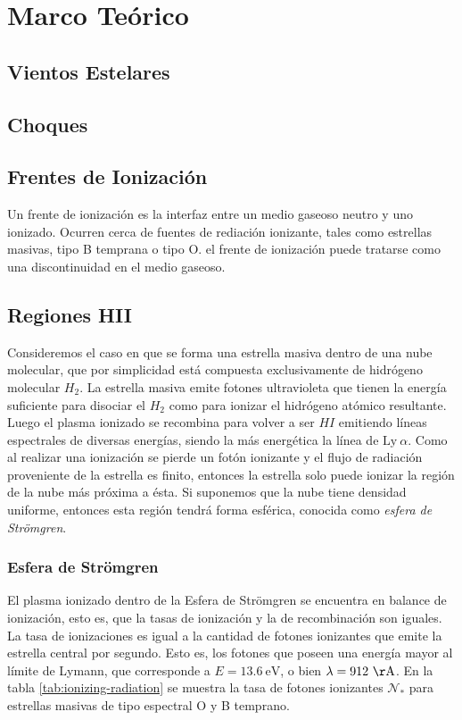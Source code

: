 \chapter{Marco Teórico}
\section{Vientos Estelares}
\section{Choques}
\section{Frentes de Ionización}
Un frente de ionización es la interfaz entre un medio gaseoso neutro y uno
ionizado. Ocurren cerca de fuentes de rediación ionizante, tales como
estrellas masivas, tipo B temprana o tipo O. el frente de ionización puede
tratarse como una discontinuidad en el medio gaseoso.

\section{Regiones HII \citep{Stahler:2004}}
\label{sec:HII}
\newcommand\Nio{\ensuremath{\mathcal{N}}}

Consideremos el caso en que se forma una estrella masiva dentro de una nube molecular, que por simplicidad está compuesta exclusivamente de hidrógeno molecular $H_2$. La estrella masiva emite fotones ultravioleta que tienen la energía suficiente para disociar el $H_2$  como para ionizar el hidrógeno atómico resultante. Luego el plasma ionizado se recombina para volver a ser $HI$ emitiendo líneas espectrales de diversas energías, siendo la más energética la línea de $\mathrm{Ly~}\alpha$. Como al realizar una ionización se pierde un fotón ionizante y el flujo de radiación proveniente de la estrella es finito, entonces la estrella solo puede ionizar la región de la nube más próxima a ésta. Si suponemos que la nube tiene densidad uniforme, entonces esta región tendrá forma esférica, conocida como \textit{esfera de Strömgren}.

\subsection{Esfera de Strömgren}

El plasma ionizado dentro de la Esfera de Strömgren se encuentra en balance de ionización, esto es, que la tasas de ionización y la de recombinación son iguales. La tasa de ionizaciones es igual a la cantidad de fotones ionizantes que emite la estrella central por segundo. Esto es, los fotones que poseen una energía mayor al límite de Lymann, que corresponde a  $E = 13.6\mathrm{~eV}$, o bien $\lambda = 912\mathrm{~\AA}$. En la tabla \ref{tab:ionizing-radiation} se muestra la tasa de fotones ionizantes $\Nio_*$ para estrellas masivas de tipo espectral O y B temprano.

